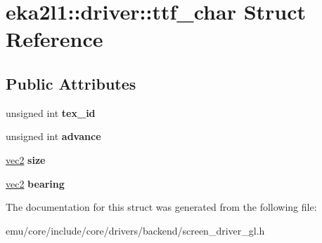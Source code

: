 \hypertarget{structeka2l1_1_1driver_1_1ttf__char}{}\section{eka2l1\+:\+:driver\+:\+:ttf\+\_\+char Struct Reference}
\label{structeka2l1_1_1driver_1_1ttf__char}
\subsection*{Public Attributes}
\begin{DoxyCompactItemize}
\item 
\mbox{\label{structeka2l1_1_1driver_1_1ttf__char_adadee708c06163158bac8cc38a01d95d}} 
unsigned int {\bfseries tex\+\_\+id}
\item 
\mbox{\label{structeka2l1_1_1driver_1_1ttf__char_abb24093e7e63ad68340ad544c5f4c7c8}} 
unsigned int {\bfseries advance}
\item 
\mbox{\label{structeka2l1_1_1driver_1_1ttf__char_a5bb0da5198c9f324eb44490838059b01}} 
\mbox{\hyperlink{structeka2l1_1_1vec2}{vec2}} {\bfseries size}
\item 
\mbox{\label{structeka2l1_1_1driver_1_1ttf__char_a1a5193815024f0c4077a5660790ff7f1}} 
\mbox{\hyperlink{structeka2l1_1_1vec2}{vec2}} {\bfseries bearing}
\end{DoxyCompactItemize}


The documentation for this struct was generated from the following file\+:\begin{DoxyCompactItemize}
\item 
emu/core/include/core/drivers/backend/screen\+\_\+driver\+\_\+gl.\+h\end{DoxyCompactItemize}
